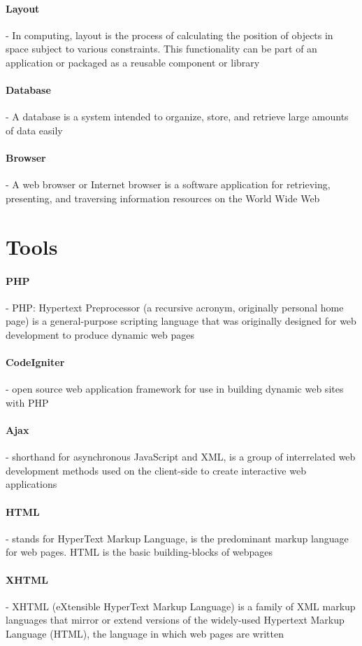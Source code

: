\paragraph{Layout} - In computing, layout is the process of calculating the position of objects in space subject to various constraints. This functionality can be part of an application or packaged as a reusable component or library
\paragraph{Database} - A database is a system intended to organize, store, and retrieve large amounts of data easily
\paragraph{Browser} - A web browser or Internet browser is a software application for retrieving, presenting, and traversing information resources on the World Wide Web


\section{Tools}
\paragraph{PHP} - PHP: Hypertext Preprocessor (a recursive acronym, originally personal home page) is a general-purpose scripting language that was originally designed for web development to produce dynamic web pages
\paragraph{CodeIgniter} - open source web application framework for use in building dynamic web sites with PHP
\paragraph{Ajax} - shorthand for asynchronous JavaScript and XML, is a group of interrelated web development methods used on the client-side to create interactive web applications
\paragraph{HTML} - stands for HyperText Markup Language, is the predominant markup language for web pages. HTML is the basic building-blocks of webpages
\paragraph{XHTML} - XHTML (eXtensible HyperText Markup Language) is a family of XML markup languages that mirror or extend versions of the widely-used Hypertext Markup Language (HTML), the language in which web pages are written
